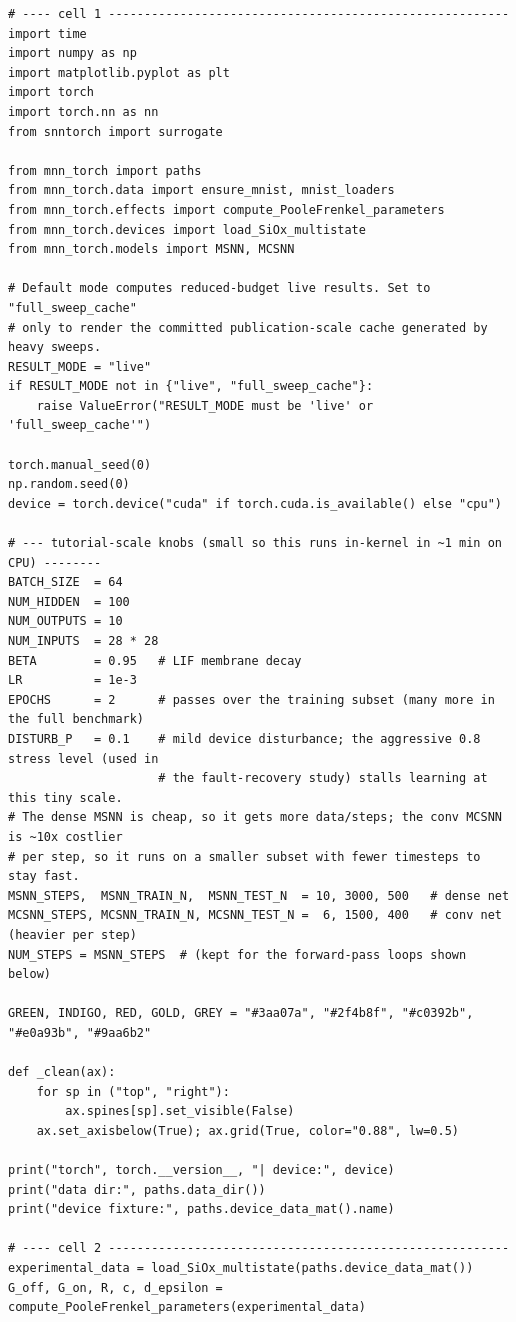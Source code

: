 \begin{lstlisting}[caption={experiments/examples.ipynb},label={lst:mnn-nb-examples}]
# ---- cell 1 --------------------------------------------------------
import time
import numpy as np
import matplotlib.pyplot as plt
import torch
import torch.nn as nn
from snntorch import surrogate

from mnn_torch import paths
from mnn_torch.data import ensure_mnist, mnist_loaders
from mnn_torch.effects import compute_PooleFrenkel_parameters
from mnn_torch.devices import load_SiOx_multistate
from mnn_torch.models import MSNN, MCSNN

# Default mode computes reduced-budget live results. Set to "full_sweep_cache"
# only to render the committed publication-scale cache generated by heavy sweeps.
RESULT_MODE = "live"
if RESULT_MODE not in {"live", "full_sweep_cache"}:
    raise ValueError("RESULT_MODE must be 'live' or 'full_sweep_cache'")

torch.manual_seed(0)
np.random.seed(0)
device = torch.device("cuda" if torch.cuda.is_available() else "cpu")

# --- tutorial-scale knobs (small so this runs in-kernel in ~1 min on CPU) --------
BATCH_SIZE  = 64
NUM_HIDDEN  = 100
NUM_OUTPUTS = 10
NUM_INPUTS  = 28 * 28
BETA        = 0.95   # LIF membrane decay
LR          = 1e-3
EPOCHS      = 2      # passes over the training subset (many more in the full benchmark)
DISTURB_P   = 0.1    # mild device disturbance; the aggressive 0.8 stress level (used in
                     # the fault-recovery study) stalls learning at this tiny scale.
# The dense MSNN is cheap, so it gets more data/steps; the conv MCSNN is ~10x costlier
# per step, so it runs on a smaller subset with fewer timesteps to stay fast.
MSNN_STEPS,  MSNN_TRAIN_N,  MSNN_TEST_N  = 10, 3000, 500   # dense net
MCSNN_STEPS, MCSNN_TRAIN_N, MCSNN_TEST_N =  6, 1500, 400   # conv net (heavier per step)
NUM_STEPS = MSNN_STEPS  # (kept for the forward-pass loops shown below)

GREEN, INDIGO, RED, GOLD, GREY = "#3aa07a", "#2f4b8f", "#c0392b", "#e0a93b", "#9aa6b2"

def _clean(ax):
    for sp in ("top", "right"):
        ax.spines[sp].set_visible(False)
    ax.set_axisbelow(True); ax.grid(True, color="0.88", lw=0.5)

print("torch", torch.__version__, "| device:", device)
print("data dir:", paths.data_dir())
print("device fixture:", paths.device_data_mat().name)

# ---- cell 2 --------------------------------------------------------
experimental_data = load_SiOx_multistate(paths.device_data_mat())
G_off, G_on, R, c, d_epsilon = compute_PooleFrenkel_parameters(experimental_data)


\end{lstlisting}
